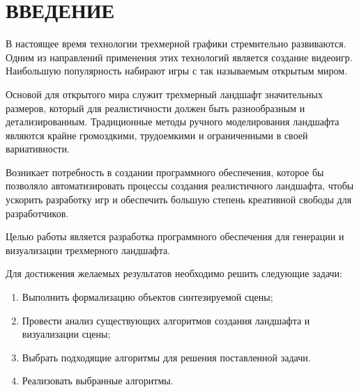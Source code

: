 \chapter*{ВВЕДЕНИЕ}

В настоящее время технологии трехмерной графики стремительно развиваются. Одним из направлений применения этих технологий является создание видеоигр. Наибольшую популярность набирают игры с так называемым открытым миром.

Основой для открытого мира служит трехмерный ландшафт значительных размеров, который для реалистичности должен быть разнообразным и детализированным. Традиционные методы ручного моделирования ландшафта являются крайне громоздкими, трудоемкими и ограниченными в своей вариативности. 

Возникает потребность в создании программного обеспечения, которое бы позволяло автоматизировать процессы создания реалистичного ландшафта, чтобы ускорить разработку игр и обеспечить большую степень креативной свободы для разработчиков.

Целью работы является разработка программного обеспечения для генерации и визуализации трехмерного ландшафта.

Для достижения желаемых результатов необходимо решить следующие задачи: 

\begin{enumerate}[label={\arabic*)}]
	\item Выполнить формализацию объектов синтезируемой сцены;
	\item Провести анализ существующих алгоритмов создания ландшафта и визуализации сцены;
	\item Выбрать подходящие алгоритмы для решения поставленной задачи.
	\item Реализовать выбранные алгоритмы.
\end{enumerate}

